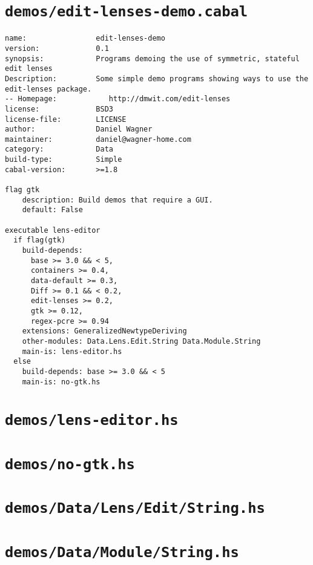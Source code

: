 \section{\texttt{demos/edit-lenses-demo.cabal}}
\begin{verbatim}
name:                edit-lenses-demo
version:             0.1
synopsis:            Programs demoing the use of symmetric, stateful edit lenses
Description:         Some simple demo programs showing ways to use the edit-lenses package.
-- Homepage:            http://dmwit.com/edit-lenses
license:             BSD3
license-file:        LICENSE
author:              Daniel Wagner
maintainer:          daniel@wagner-home.com
category:            Data
build-type:          Simple
cabal-version:       >=1.8

flag gtk
    description: Build demos that require a GUI.
    default: False

executable lens-editor
  if flag(gtk)
    build-depends:
      base >= 3.0 && < 5,
      containers >= 0.4,
      data-default >= 0.3,
      Diff >= 0.1 && < 0.2,
      edit-lenses >= 0.2,
      gtk >= 0.12,
      regex-pcre >= 0.94
    extensions: GeneralizedNewtypeDeriving
    other-modules: Data.Lens.Edit.String Data.Module.String
    main-is: lens-editor.hs
  else
    build-depends: base >= 3.0 && < 5
    main-is: no-gtk.hs

\end{verbatim}

\section{\texttt{demos/lens-editor.hs}}
\label{mod:lens-editor}


\section{\texttt{demos/no-gtk.hs}}
\label{mod:no-gtk}


\section{\texttt{demos/Data/Lens/Edit/String.hs}}
\label{mod:Data.Lens.Edit.String}


\section{\texttt{demos/Data/Module/String.hs}}
\label{mod:Data.Module.String}


